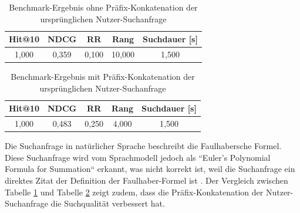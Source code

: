 \documentclass[12pt,letterpaper]{article} %
\begin{document}
\begin{minipage}[t]{0.485\textwidth}
    \scriptsize
    \begin{table}[H]
    \centering
    \scriptsize
    \begin{tabular}{ccccc}
    \toprule
    \textbf{Hit@10} & \textbf{NDCG} & \textbf{RR} & \textbf{Rang} & \textbf{Suchdauer [s]} \\
    \midrule
    1,000 & 0,359 & 0,100 & 10,000 & 1,500 \\
    \bottomrule
    \end{tabular}
    \caption{Benchmark-Ergebnis ohne Präfix-Konkatenation der ursprünglichen Nutzer-Suchanfrage}
    \label{tab:suchanfrage_falsch_umschrieben_ergebnis_ohne_prefix}
    \end{table}
\end{minipage}
\hspace{0.01\textwidth}
\begin{minipage}[t]{0.485\textwidth}
    \scriptsize
    \begin{table}[H]
    \centering
    \scriptsize
    \begin{tabular}{ccccc}
    \toprule
    \textbf{Hit@10} & \textbf{NDCG} & \textbf{RR} & \textbf{Rang} & \textbf{Suchdauer [s]} \\
    \midrule
    1,000 & 0,483 & 0,250 & 4,000 & 1,500 \\
    \bottomrule
    \end{tabular}
    \caption{Benchmark-Ergebnis mit Präfix-Konkatenation der ursprünglichen Nutzer-Suchanfrage}
    \label{tab:suchanfrage_falsch_umschrieben_ergebnis_mit_prefix}
    \end{table}
\end{minipage}
\vspace{1em}
\justifying

Die Suchanfrage in natürlicher Sprache beschreibt die Faulhabersche Formel.
Diese Suchanfrage wird vom Sprachmodell jedoch als ``Euler's Polynomial Formula for Summation`` erkannt, was nicht korrekt ist, weil die Suchanfrage ein direktes Zitat der Definition der Faulhaber-Formel ist \citep[S. 1]{mircea_merca_alternative_2015}.
Der Vergleich zwischen Tabelle \ref{tab:suchanfrage_falsch_umschrieben_ergebnis_ohne_prefix} und Tabelle \ref{tab:suchanfrage_falsch_umschrieben_ergebnis_mit_prefix} zeigt zudem, dass die Präfix-Konkatenation der Nutzer-Suchanfrage die Suchqualität verbessert hat.
\end{document}
